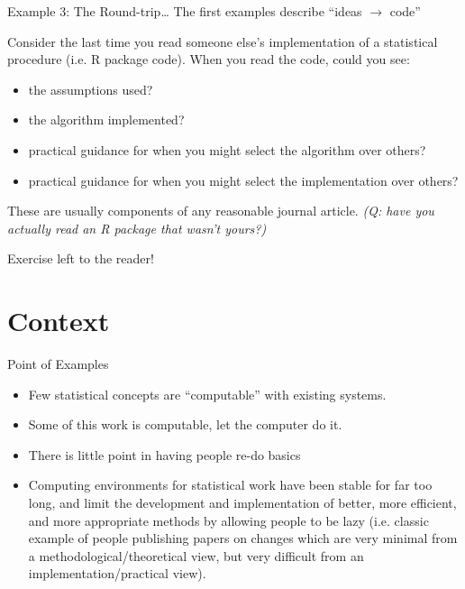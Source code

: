 \documentclass{beamer}
\begin{document}
\begin{frame}{Example 3: The Round-trip\ldots} 
  \label{example3}
  The first examples describe ``ideas $\rightarrow$ code''

  Consider the last time you read someone else's implementation of a
  statistical procedure (i.e. R package code).  When you read the
  code, could you see:
  \begin{itemize}
  \item the assumptions used?
  \item the algorithm implemented?
  \item practical guidance for when you might select the algorithm
    over others? 
  \item practical guidance for when you might select the
    implementation over others? 
  \end{itemize}
  These are usually components of any reasonable journal article.
  \textit{(Q: have you actually read an R package that wasn't yours?)}
\end{frame}

\begin{frame}{Exercise left to the reader!}

\end{frame}

\section{Context}

\begin{frame}{Point of Examples}
  \begin{itemize}
  \item Few statistical concepts are ``computable'' with existing systems.

  \item Some of this work is computable, let the computer do it.

  \item There is little point in having people re-do basics

  \item Computing environments for statistical work have been stable
    for far too long, and limit the development and implementation of
    better, more efficient, and more appropriate methods by allowing
    people to be lazy (i.e. classic example of people publishing
    papers on changes which are very minimal from a
    methodological/theoretical view, but very difficult from an
    implementation/practical view).
  \end{itemize}
\end{frame}
\end{document}
